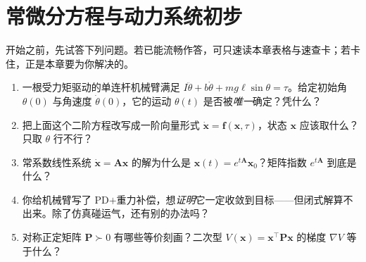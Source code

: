 \chapter{常微分方程与动力系统初步}
\label{ch:ode}


\begin{practice}[前置自测]
开始之前，先试答下列问题。若已能流畅作答，可只速读本章表格与速查卡；若卡住，正是本章要为你解决的。
\begin{enumerate}
  \item 一根受力矩驱动的单连杆机械臂满足 $I\ddot\theta+b\dot\theta+mg\ell\sin\theta=\tau$。给定初始角 $\theta(0)$ 与角速度 $\dot\theta(0)$，它的运动 $\theta(t)$ 是否被\emph{唯一}确定？凭什么？
  \item 把上面这个二阶方程改写成一阶向量形式 $\dot{\mathbf{x}}=\mathbf{f}(\mathbf{x},\tau)$，状态 $\mathbf{x}$ 应该取什么？只取 $\theta$ 行不行？
  \item 常系数线性系统 $\dot{\mathbf{x}}=\mathbf{A}\mathbf{x}$ 的解为什么是 $\mathbf{x}(t)=e^{t\mathbf{A}}\mathbf{x}_0$？矩阵指数 $e^{t\mathbf{A}}$ 到底是什么？
  \item 你给机械臂写了 PD$+$重力补偿，想\emph{证明}它一定收敛到目标——但闭式解算不出来。除了仿真碰运气，还有别的办法吗？
  \item 对称正定矩阵 $\mathbf{P}\succ0$ 有哪些等价刻画？二次型 $V(\mathbf{x})=\mathbf{x}^\top\mathbf{P}\mathbf{x}$ 的梯度 $\nabla V$ 等于什么？
\end{enumerate}
\end{practice}

